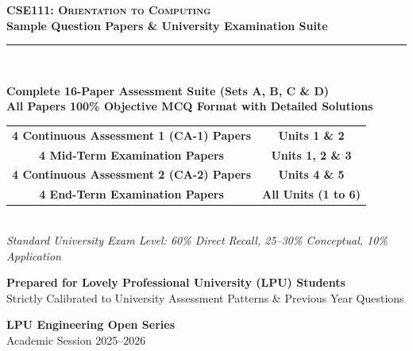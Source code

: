 \begin{titlepage}
\pagecolor{CSNavy}
\color{white}
\vspace*{1.5cm}

\begin{center}
    {\Huge \bfseries \scshape CSE111: Orientation to Computing}\\[5mm]
    {\LARGE \bfseries Sample Question Papers \& University Examination Suite}\\[8mm]
    {\color{LPUOrange}\rule{0.8\textwidth}{2pt}}\\[10mm]

    \begin{tcolorbox}[enhanced, width=0.88\textwidth, colback=white, colframe=LPUOrange, boxrule=1.5pt, arc=3mm, halign=center]
        \color{DarkSlate}
        \vspace{2mm}
        {\Large\bfseries Complete 16-Paper Assessment Suite (Sets A, B, C \& D)}\\[3mm]
        {\large\bfseries All Papers 100\% Objective MCQ Format with Detailed Solutions}\\[3mm]
        \begin{tabular}{cc}
            \color{CSNavy}\textbf{4 Continuous Assessment 1 (CA-1) Papers} & \quad \color{CSNavy}\textbf{Units 1 \& 2} \\
            \color{CSNavy}\textbf{4 Mid-Term Examination Papers}          & \quad \color{CSNavy}\textbf{Units 1, 2 \& 3} \\
            \color{CSNavy}\textbf{4 Continuous Assessment 2 (CA-2) Papers} & \quad \color{CSNavy}\textbf{Units 4 \& 5} \\
            \color{CSNavy}\textbf{4 End-Term Examination Papers}          & \quad \color{CSNavy}\textbf{All Units (1 to 6)} \\
        \end{tabular}\\[3mm]
        \textit{Standard University Exam Level: 60\% Direct Recall, 25--30\% Conceptual, 10\% Application}
        \vspace{2mm}
    \end{tcolorbox}

    \vfill

    {\large \bfseries Prepared for Lovely Professional University (LPU) Students}\\[2mm]
    {\small Strictly Calibrated to University Assessment Patterns \& Previous Year Questions}\\[10mm]

    \begin{tcolorbox}[width=0.6\textwidth, colback=CSNavy!80!black, colframe=white, boxrule=0.5pt, halign=center]
        \color{white}
        \textbf{LPU Engineering Open Series}\\[1mm]
        {\footnotesize Academic Session 2025--2026}
    \end{tcolorbox}
    \vspace*{1cm}
\end{center}
\end{titlepage}
\nopagecolor
\newpage

